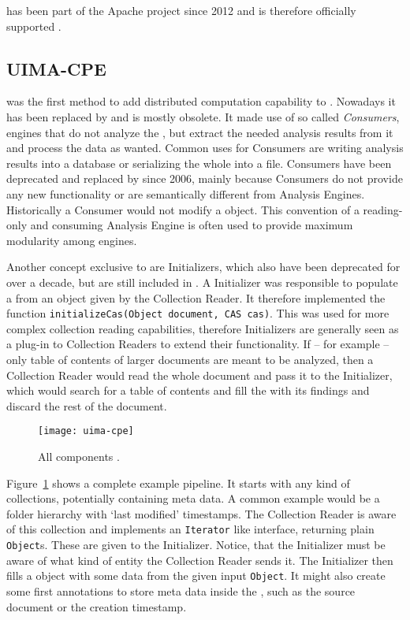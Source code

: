\uimafit{} has been part of the Apache \uima{} project since 2012 and is therefore officially supported \cite{github:uimafit}. 



\subsection{UIMA-CPE}
\label{ssec:uimacpe}
\uimacpe{} was the first method to add distributed computation capability to \uima{}. Nowadays it has been replaced by \uimaas{} and is mostly obsolete. It made use of so called \emph{\cas{} Consumers}, engines that do not analyze the \cas{}, but extract the needed analysis results from it and process the data as wanted. Common uses for \cas{} Consumers are writing analysis results into a database or serializing the whole \cas{} into a \xmi{} file. \cas{} Consumers have been deprecated and replaced by \anens{} since 2006, mainly because \cas{} Consumers do not provide any new functionality or are semantically different from Analysis Engines. Historically a \cas{} Consumer would not modify a \cas{} object. This convention of a reading-only and consuming Analysis Engine is often used to provide maximum modularity among \uima{} engines.


Another concept exclusive to \uimacpe{} are \cas{} Initializers, which also have been deprecated for over a decade, but are still included in \uima{}. A \cas{} Initializer was responsible to populate a \cas{} from an object given by the Collection Reader. It therefore implemented the function \lstinline|initializeCas(Object document, CAS cas)|. This was used for more complex collection reading capabilities, therefore \cas{} Initializers are generally seen as a plug-in to Collection Readers to extend their functionality. If -- for example -- only table of contents of larger documents are meant to be analyzed, then a Collection Reader would read the whole document and pass it to the \cas{} Initializer, which would search for a table of contents and fill the \cas{} with its findings and discard the rest of the document.


\begin{figure}[hbt]
	
	\centering
	\texttt{[image: uima-cpe]}
	\caption[All \uimacpe{} components.]{All \uimacpe{} components \cite{uimacpe}.}
	\label{fig:uimacpe}
\end{figure}


Figure~\ref{fig:uimacpe} shows a complete example pipeline. It starts with any kind of collections, potentially containing meta data. A common example would be a folder hierarchy with `last modified' timestamps. The Collection Reader is aware of this collection and implements an \lstinline|Iterator| like interface, returning plain \lstinline|Object|s. These are given to the \cas{} Initializer. Notice, that the \cas{} Initializer must be aware of what kind of entity the Collection Reader sends it. The \cas{} Initializer then fills a \cas{} object with some data from the given input \lstinline|Object|. It might also create some first annotations to store meta data inside the \cas{}, such as the source document \URL{} or the creation timestamp. 

